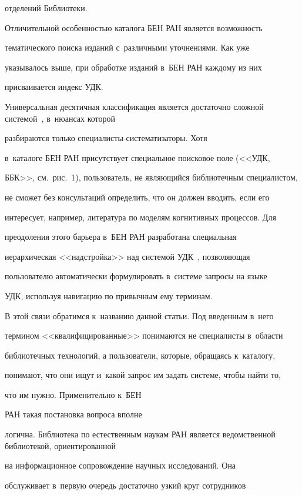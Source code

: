 отделений Библиотеки. 

  

  Отличительной особенностью каталога БЕН РАН является возможность 

тематического поиска изданий с~различными уточнениями. Как уже 

указывалось выше, при обработке изданий в~БЕН РАН каждому из них 

присваивается индекс УДК. 

Универсальная десятичная классификация является достаточно сложной системой~\cite{8-vla}, в~нюансах которой 

разбираются только спе\-ци\-а\-листы-сис\-те\-ма\-ти\-за\-то\-ры. Хотя 

в~каталоге БЕН РАН присутствует специальное поисковое поле (<<УДК, 

ББК>>, см.\ рис.~1), пользователь, не являющийся библиотечным специалистом, 

не сможет без консультаций определить, что он должен вводить, если его 

интересует, например, литература по моделям когнитивных процессов. Для 

преодоления этого барьера в~БЕН РАН разработана специальная 

иерархическая <<надстройка>> над системой УДК~\cite{9-vla}, позволяющая 

пользователю автоматически формулировать в~системе запросы на языке 

УДК, используя навигацию по привычным ему терминам. 

  

  В этой связи обратимся к~названию данной статьи. Под введенным в~него 

термином <<квалифицированные>> понимаются не специалисты в~области 

библиотечных технологий, а пользователи, которые, обращаясь к~каталогу, 

понимают, что они ищут и~какой запрос им задать системе, чтобы найти то, 

что им нужно. Применительно к~БЕН 

РАН такая постановка вопроса вполне 

логична. Библиотека по естественным наукам РАН является ведомственной библиотекой, ориентированной 

на информационное сопровождение научных исследований. Она 

обслуживает в~первую очередь достаточно узкий круг сотрудников 

